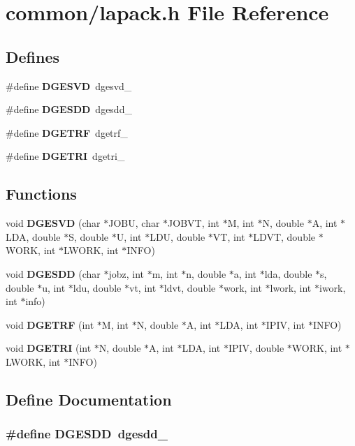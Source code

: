\section{common/lapack.h File Reference}
\label{lapack_8h}


\subsection*{Defines}
\begin{CompactItemize}
\item 
\#define {\bf DGESVD}~dgesvd\_\-
\item 
\#define {\bf DGESDD}~dgesdd\_\-
\item 
\#define {\bf DGETRF}~dgetrf\_\-
\item 
\#define {\bf DGETRI}~dgetri\_\-
\end{CompactItemize}
\subsection*{Functions}
\begin{CompactItemize}
\item 
void {\bf DGESVD} (char $\ast$JOBU, char $\ast$JOBVT, int $\ast$M, int $\ast$N, double $\ast$A, int $\ast$LDA, double $\ast$S, double $\ast$U, int $\ast$LDU, double $\ast$VT, int $\ast$LDVT, double $\ast$WORK, int $\ast$LWORK, int $\ast$INFO)
\item 
void {\bf DGESDD} (char $\ast$jobz, int $\ast$m, int $\ast$n, double $\ast$a, int $\ast$lda, double $\ast$s, double $\ast$u, int $\ast$ldu, double $\ast$vt, int $\ast$ldvt, double $\ast$work, int $\ast$lwork, int $\ast$iwork, int $\ast$info)
\item 
void {\bf DGETRF} (int $\ast$M, int $\ast$N, double $\ast$A, int $\ast$LDA, int $\ast$IPIV, int $\ast$INFO)
\item 
void {\bf DGETRI} (int $\ast$N, double $\ast$A, int $\ast$LDA, int $\ast$IPIV, double $\ast$WORK, int $\ast$LWORK, int $\ast$INFO)
\end{CompactItemize}


\subsection{Define Documentation}
\subsubsection{\setlength{\rightskip}{0pt plus 5cm}\#define DGESDD~dgesdd\_\-}\label{lapack_8h_613b4e35c3ce7e1fd9e97f14b18bbd42_613b4e35c3ce7e1fd9e97f14b18bbd42}


